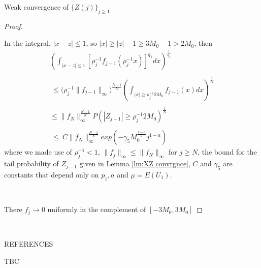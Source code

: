 \documentclass[12pt]{article}
\begin{document}
\begin{section}{Weak convergence of $\{Z(j)\}_{j \ge 1}$ }
\begin{proof}
\

In the integral, $|x-z| \le 1$, so $|x| \ge |z| - 1 \ge 3 M_0 - 1 > 2 M_0$, then
\begin{align*}
&\left( \int_{|x-z|\le 1} \left[ \rho_j^{-1} f_{j-1}(\rho_j^{-1}x) \right]^{q_1} dx \right)^{\frac{1}{q_1}} &\\
&\ &\\
&\  \le 
\Bigg( \rho_j^{-1} \|f_{j-1}\|_{\infty} \Bigg)^{\frac{N-1}{N}} 
\left(  \int_{|x|\ge \rho_j^{-1} 2 M_0} f_{j-1}(x) dx \right)^{\frac{1}{N}} \\
&\ &\\
&\le \|f_{N}\|_{\infty}^{\frac{N-1}{N}} P(|Z_{j-1}| \ge \rho_j^{-1} 2 M_0)^{\frac{1}{N}} &\\
&\ &\\
&~\le~ C \|f_{N}\|_{\infty}^{\frac{N-1}{N}} exp\left(-\gamma_5 M_0^{\frac{1-a}{a} } j^{1-a} \right)&
\end{align*}
where we made use of $\rho_j^{-1} < 1$, $\|f_{j}\|_{\infty} \le \|f_{N}\|_{\infty}$ for $j \ge N$, the bound for the tail probability of $Z_{j-1}$ given in Lemma \ref{lm:XZ convrgnce}, $C$ and $\gamma_5$ are constants that depend only on $p_1, a$ and $\mu = E( U_1)$.  

\  

There $f_j \rightarrow 0$ uniformly in the complement of $[-3M_0, 3M_0]$

\end{proof}




\end{section}



\  
  

REFERENCES  

TBC
\end{document}
